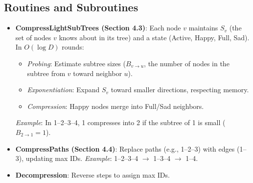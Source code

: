 \documentclass[11pt]{article}
\begin{document}
\subsection{Routines and Subroutines}
\begin{itemize}
    \item \textbf{CompressLightSubTrees (Section 4.3)}:  
        Each node \(v\) maintains \(S_v\) (the set of nodes \(v\) knows about in its tree) and a state (Active, Happy, Full, Sad). In \(O(\log D)\) rounds:
        \begin{itemize}
            \item \textit{Probing}: Estimate subtree sizes (\(B_{v \rightarrow u}\), the number of nodes in the subtree from \(v\) toward neighbor \(u\)).
            \item \textit{Exponentiation}: Expand \(S_v\) toward smaller directions, respecting memory.
            \item \textit{Compression}: Happy nodes merge into Full/Sad neighbors.
        \end{itemize}
        \textit{Example}: In 1--2--3--4, 1 compresses into 2 if the subtree of 1 is small (\(B_{2 \rightarrow 1} = 1\)).
    \item \textbf{CompressPaths (Section 4.4)}:  
        Replace paths (e.g., 1--2--3) with edges (1--3), updating max IDs.  
        \textit{Example}: 1--2--3--4 \(\rightarrow\) 1--3--4 \(\rightarrow\) 1--4.
    \item \textbf{Decompression}: Reverse steps to assign max IDs.
\end{itemize}
\end{document}
